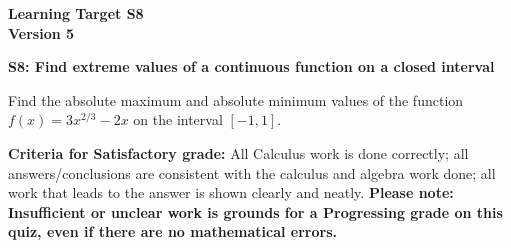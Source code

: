 \documentclass[10pt]{article}
\begin{document}
	\vspace*{0in}

		\begin{center}
			\textbf{Learning Target S8 \\
			Version 5} 
		\end{center}


\begin{framed}
	\textbf{S8: Find extreme values of a continuous function on a closed interval}
\end{framed}

Find the absolute maximum and absolute minimum values of the function $f(x)=3x^{2/3}-2x$ on the interval $[-1,1]$.

\vfill

\begin{small}
    \begin{framed}
        	\textbf{Criteria for Satisfactory grade:} All Calculus work is done correctly; all answers/conclusions are consistent with the calculus and algebra work done; all work that leads to the answer is shown clearly and neatly. \textbf{Please note: Insufficient or unclear work is grounds for a Progressing grade on this quiz, even if there are no mathematical errors.}
    \end{framed}

\end{small}
\end{document}
